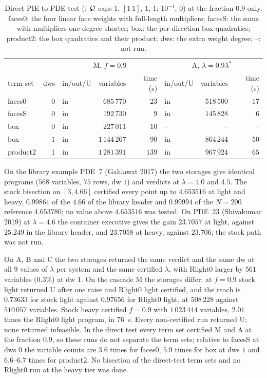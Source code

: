 \begin{table}[h]\centering\scriptsize
\setlength{\tabcolsep}{4pt}
\begin{tabular}{lrlrrlrr}
\toprule
 & & \multicolumn{3}{c}{M, $f=0.9$} & \multicolumn{3}{c}{A, $\lambda=0.9\lambda^*$} \\
term set & dws & in/out/U & variables & time (s) & in/out/U & variables & time (s) \\
\midrule
faces0 & $0$ & in & $685\,770$ & $23$ & in & $518\,500$ & $17$ \\
facesS & $0$ & in & $192\,730$ & $9$ & in & $145\,828$ & $6$ \\
box & $0$ & in & $227\,011$ & $10$ & -- & -- & -- \\
box & $1$ & in & $1\,144\,267$ & $90$ & in & $864\,244$ & $50$ \\
product2 & $1$ & in & $1\,281\,391$ & $139$ & in & $967\,924$ & $65$ \\
\bottomrule
\end{tabular}
\caption{Direct PIE-to-PDE test (: $\mathcal{Q}$ caps  $1$,  $[1\ 1]$,  $1$,  $1$;  $10^{-4}$,  $0$) at the fraction $0.9$ only. faces0: the four linear face weights with full-length multipliers; facesS: the same with multipliers one degree shorter; box: the per-direction box quadratics; product2: the box quadratics and their product; dws: the extra weight degree; --: not run.}\label{tab:bl-inhom-direct}
\end{table}

On the library example PDE~7 (Gahlawat 2017) the two storages give identical programs ($568$ variables, $75$ rows, dw $1$) and verdicts at $\lambda=4.0$ and $4.5$. The stock bisection on $[3,4.66]$ certified every point up to $4.653516$ at light and heavy, $0.99861$ of the $4.66$ of the library header and $0.99994$ of the $N=200$ reference $4.653780$; no value above $4.653516$ was tested. On PDE~23 (Shivakumar 2019) at $\lambda=4.6$ the container executive  gives the gain $23.7057$ at light, against $25.249$ in the library header, and $23.7058$ at heavy, against $23.706$; the stock  path was not run.

On A, B and C the two storages returned the same verdict and the same dw at all $9$ values of $\lambda$ per system and the same certified $\lambda$, with Rlight0 larger by $561$ variables ($0.3\%$) at dw $1$. On the cascade M the storages differ: at $f=0.9$ stock light returned U after one raise and Rlight0 light certified, and the reach is $0.73633$ for stock light against $0.97656$ for Rlight0 light, at $508\,228$ against $510\,057$ variables. Stock heavy certified $f=0.9$ with $1\,023\,444$ variables, $2.01$ times the Rlight0 light program, in $76$~s. Every non-certified run returned U; none returned infeasible. In the direct test every term set certified M and A at the fraction $0.9$, so these runs do not separate the term sets; relative to facesS at dws $0$ the variable counts are $3.6$ times for faces0, $5.9$ times for box at dws $1$ and $6.6$--$6.7$ times for product2. No bisection of the direct-test term sets and no Rlight0 run at the heavy tier was done.
